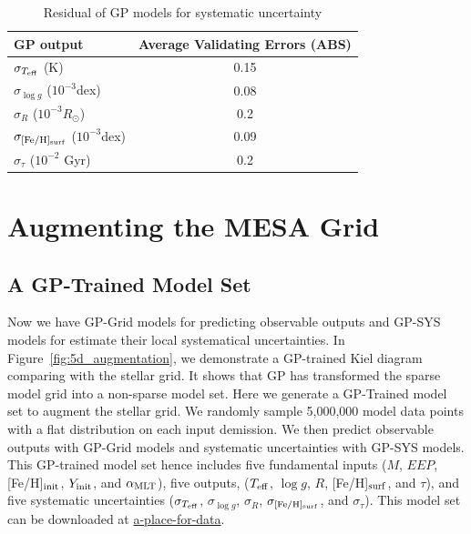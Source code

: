 \begin{table}
	\centering
	\caption{Residual of GP models for systematic uncertainty}
	\label{tab:sys}
	\begin{tabular}{lc}
		\hline
		GP output& Average Validating Errors (ABS) \\
		\hline
		$\sigma_{T_{\rm eff}}$  (K) & 0.15 \\
		$\sigma_{\log g}$  ($10^{-3}$dex)   & 0.08 \\
		$\sigma_{R}$ ($10^{-3}R_{\odot}$)   & 0.2 \\
		$\sigma_{\rm [Fe/H]_{\rm surf}}$ ($10^{-3}$dex) & 0.09 \\
		$\sigma_{\tau}$ ($10^{-2}$ Gyr)  & 0.2\\
		  \hline
	\end{tabular}
\end{table}


\section{Augmenting the MESA Grid}\label{sec:augmentation}

\subsection{A GP-Trained Model Set}

Now we have GP-Grid models for predicting observable outputs and GP-SYS models for estimate their local systematical uncertainties. 
In Figure~\ref{fig:5d_augmentation}, we demonstrate a GP-trained Kiel diagram comparing with the stellar grid. It shows that GP has transformed the sparse model grid into a non-sparse model set. 
%
Here we generate a GP-Trained model set to augment the stellar grid. We randomly sample 5,000,000 model data points with a flat distribution on each input demission. We then predict observable outputs with GP-Grid models and systematic uncertainties with GP-SYS models. 
%
This GP-trained model set hence includes five fundamental inputs ($M$, $EEP$, [Fe/H]$_{\rm init}$, $Y_{\rm init}$, and $\alpha_{\rm MLT}$), five outputs, ($T_{\rm eff}$, $\log g$,  $R$,  [Fe/H]$_{\rm surf}$, and  $\tau$), and five systematic uncertainties ($\sigma_{T_{\rm eff}}$, $\sigma_{\log g}$,  $\sigma_{R}$,  $\sigma_{\rm [Fe/H]_{\rm surf}}$, and $\sigma_{\tau}$). This model set can be downloaded at \url{a-place-for-data}. 

